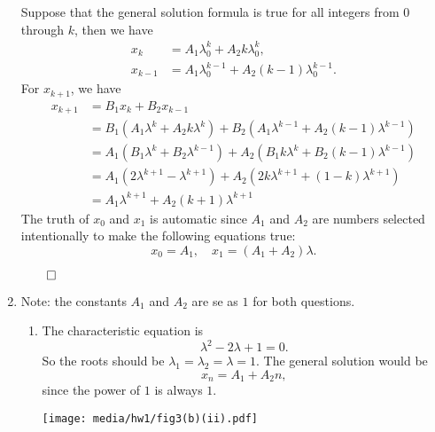 \documentclass[
    classnum=MATH564,
    classname=MATHEMATICAL\ MODELING,
    due=January\ 28\,\ 2020,
    author=Gabrielle\ Streeter\qquad Hannah\ Wu\qquad\ Minghang\ Li,
    authorshort=Streeter\ \&\ Wu\ \&\ Li,
    teacher= Zachary\ M.\ Boyd,
    hw=1
]{hw-template}
\newenvironment{Figure}
  {\par\medskip\noindent\minipage{\linewidth}}
  {\endminipage\par\medskip}
\begin{document}
\begin{homeworkProblem}
\begin{enumerate}
    Suppose that the general solution formula is true for all integers from $0$
    through $k$, then we have\[
    \begin{aligned}
        x_k &= A_1 \lambda_0^k + A_2 k \lambda_0^k,\\
        x_{k-1} &= A_1 \lambda_0^{k-1} + A_2 (k-1) \lambda_0^{k-1}.
    \end{aligned}
    \]
    For $x_{k+1}$, we have \[
        \begin{aligned}
            x_{k+1} &= B_1 x_{k} + B_2 x_{k-1}\\
            &= B_1 (A_1 \lambda^k + A_2 k \lambda^k) +
            B_2 (A_1 \lambda^{k-1} + A_2 (k-1) \lambda^{k-1})\\
            &= A_1 (B_1 \lambda^k + B_2 \lambda^{k-1}) +
            A_2 (B_1 k \lambda^k + B_2 (k-1) \lambda^{k-1})\\
            &= A_1 (2\lambda^{k+1} - \lambda^{k+1}) +
            A_2 (2k\lambda^{k+1} + (1-k) \lambda^{k+1})\\
            &= A_1 \lambda^{k+1} + A_2 (k+1) \lambda^{k+1}
        \end{aligned}
    \]
    The truth of $x_0$ and $x_1$ is automatic since $A_1$ and $A_2$ are numbers
    selected intentionally to make the following equations true: \[
        x_0 = A_1, \quad x_1 = (A_1 + A_2) \lambda.
    \]
    \begin{flushright}
        $\qed$
    \end{flushright}

    \pagebreak
    \item Note: the constants $A_1$ and $A_2$ are se as $1$ for both questions.
    \begin{enumerate}[label=(\roman*)]
    \addtocounter{enumii}{1}
        \item The characteristic equation is \[
            \lambda^2 - 2\lambda + 1 = 0.
        \]
        So the roots should be $\lambda_1 = \lambda_2 = \lambda = 1$.
        The general solution would be \[
            x_n = A_1 + A_2 n,
        \] since the power of $1$ is always $1$.
        \begin{Figure}
            \centering
            \texttt{[image: media/hw1/fig3(b)(ii).pdf]}
        \end{Figure}


\end{enumerate}
\end{enumerate}
\end{homeworkProblem}
\end{document}

